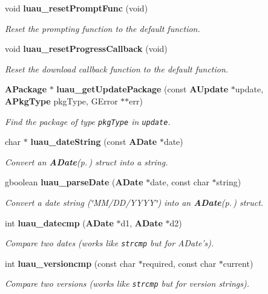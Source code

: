 \begin{CompactItemize}
void {\bf luau\_\-reset\-Prompt\-Func} (void)
\begin{CompactList}\small\item\em Reset the prompting function to the default function. \item\end{CompactList}\item 
void {\bf luau\_\-reset\-Progress\-Callback} (void)
\begin{CompactList}\small\item\em Reset the download callback function to the default function. \item\end{CompactList}\item 
{\bf APackage} $\ast$ {\bf luau\_\-get\-Update\-Package} (const {\bf AUpdate} $\ast$update, {\bf APkg\-Type} pkg\-Type, GError $\ast$$\ast$err)
\begin{CompactList}\small\item\em Find the package of type {\tt pkg\-Type} in {\tt update}. \item\end{CompactList}\item 
char $\ast$ {\bf luau\_\-date\-String} (const {\bf ADate} $\ast$date)
\begin{CompactList}\small\item\em Convert an {\bf ADate}{\rm (p.\,\pageref{structADate})} struct into a string. \item\end{CompactList}\item 
gboolean {\bf luau\_\-parse\-Date} ({\bf ADate} $\ast$date, const char $\ast$string)
\begin{CompactList}\small\item\em Convert a date string (\char`\"{}MM/DD/YYYY\char`\"{}) into an {\bf ADate}{\rm (p.\,\pageref{structADate})} struct. \item\end{CompactList}\item 
int {\bf luau\_\-datecmp} ({\bf ADate} $\ast$d1, {\bf ADate} $\ast$d2)
\begin{CompactList}\small\item\em Compare two dates (works like {\tt strcmp} but for ADate's). \item\end{CompactList}\item 
int {\bf luau\_\-versioncmp} (const char $\ast$required, const char $\ast$current)
\begin{CompactList}\small\item\em Compare two versions (works like {\tt strcmp} but for version strings). \item\end{CompactList}\item 
$$
\end{CompactItemize}
